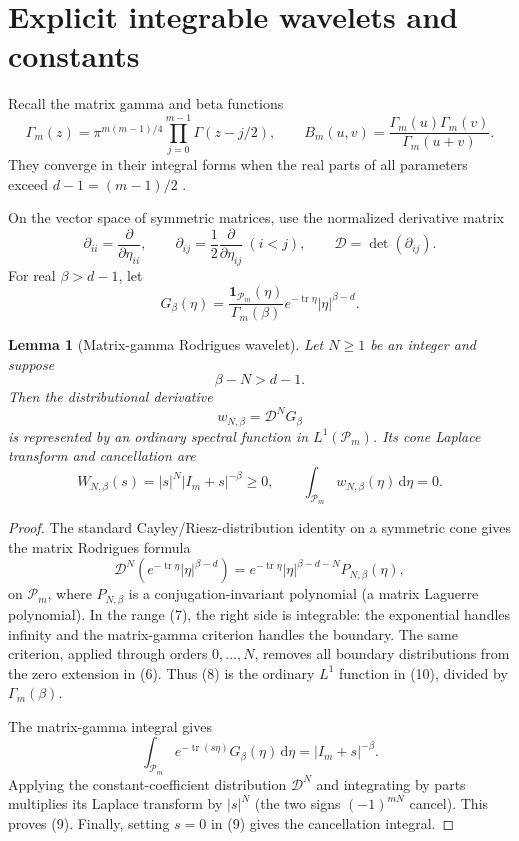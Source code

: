 \documentclass[11pt]{article}
\newtheorem{lemma}[theorem]{Lemma}
\theoremstyle{remark}
\newcommand{\Pm}{\mathcal P_m}
\newcommand{\tr}{\operatorname{tr}}
\newcommand{\dd}{\,\mathrm d}
\newcommand{\Id}{I_m}
\begin{document}
\section{Explicit integrable wavelets and constants}

Recall the matrix gamma and beta functions
\[
 \Gamma_m(z)=\pi^{m(m-1)/4}\prod_{j=0}^{m-1}\Gamma(z-j/2),
\qquad
 B_m(u,v)=\frac{\Gamma_m(u)\Gamma_m(v)}{\Gamma_m(u+v)}.
\]
They converge in their integral forms when the real parts of all parameters
exceed $d-1=(m-1)/2$ \cite[formulas (8.4)--(8.5)]{source}.

On the vector space of symmetric matrices, use the normalized derivative
matrix
\[
 \partial_{ii}=\frac{\partial}{\partial\eta_{ii}},\qquad
 \partial_{ij}=\frac12\frac{\partial}{\partial\eta_{ij}}\ (i<j),
 \qquad \mathcal D=\det(\partial_{ij}).
\]
For real $\beta>d-1$, let
\[
 G_\beta(\eta)=\frac{\mathbf1_{\Pm}(\eta)}{\Gamma_m(\beta)}
 e^{-\tr\eta}|\eta|^{\beta-d}.                                  \tag{6}
\]

\begin{lemma}[Matrix-gamma Rodrigues wavelet]\label{lem:rodrigues}
Let $N\geq1$ be an integer and suppose
\[
 \beta-N>d-1.                                                     \tag{7}
\]
Then the distributional derivative
\[
 w_{N,\beta}=\mathcal D^NG_\beta                                \tag{8}
\]
is represented by an ordinary spectral function in $L^1(\Pm)$.  Its cone
Laplace transform and cancellation are
\[
 W_{N,\beta}(s)=|s|^N|\Id+s|^{-\beta}\geq0,
 \qquad \int_{\Pm}w_{N,\beta}(\eta)\dd\eta=0.                  \tag{9}
\]
\end{lemma}

\begin{proof}
The standard Cayley/Riesz-distribution identity on a symmetric cone
\cite[Chapter VII]{farautkoranyi} gives the matrix Rodrigues formula
\[
 \mathcal D^N\!\left(e^{-\tr\eta}|\eta|^{\beta-d}\right)
 =e^{-\tr\eta}|\eta|^{\beta-d-N}P_{N,\beta}(\eta),              \tag{10}
\]
on $\Pm$, where $P_{N,\beta}$ is a conjugation-invariant polynomial (a
matrix Laguerre polynomial).  In the range (7), the right side is integrable:
the exponential handles infinity and the matrix-gamma criterion handles the
boundary.  The same criterion, applied through orders $0,\ldots,N$, removes
all boundary distributions from the zero extension in (6).  Thus (8) is the
ordinary $L^1$ function in (10), divided by $\Gamma_m(\beta)$.

The matrix-gamma integral gives
\[
 \int_{\Pm}e^{-\tr(s\eta)}G_\beta(\eta)\dd\eta
 =|\Id+s|^{-\beta}.                                              \tag{11}
\]
Applying the constant-coefficient distribution $\mathcal D^N$ and integrating
by parts multiplies its Laplace transform by $|s|^N$ (the two signs
$(-1)^{mN}$ cancel).  This proves (9).  Finally, setting $s=0$ in (9) gives
the cancellation integral.
\end{proof}
\end{document}
